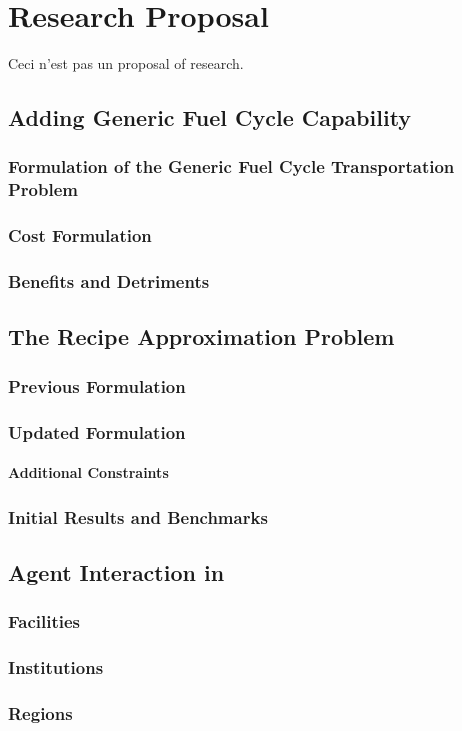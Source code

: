 \chapter{Research Proposal}\label{ch:research}

Ceci n'est pas un proposal of research. 

\section{Adding Generic Fuel Cycle Capability}

\subsection{Formulation of the Generic Fuel Cycle Transportation Problem}
\subsection{Cost Formulation}
\subsection{Benefits and Detriments}

\section{The Recipe Approximation Problem}

\subsection{Previous Formulation}
\subsection{Updated Formulation}
\subsubsection{Additional Constraints}
\subsection{Initial Results and Benchmarks}

\section{Agent Interaction in \Cyclus}

\subsection{Facilities}
\subsection{Institutions}
\subsection{Regions}
